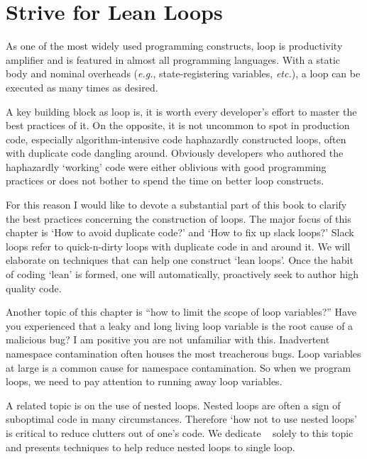 
\chapter{Strive for Lean Loops} \label{ch:loops}

As one of the most widely used programming constructs, loop is productivity
amplifier and is featured in almost all programming languages.
With a static body and nominal overheads (\textit{e.g.},
state-registering variables, \textit{etc.}), a loop can be executed as many times as desired.


A key building block as loop is, it is worth every developer's effort to master the best
practices of it.
On the opposite, it is not uncommon to spot in production code, especially algorithm-intensive code
haphazardly constructed loops, often with duplicate code dangling around.
Obviously developers who authored the haphazardly `working' code were either oblivious
with good programming practices or does not bother to spend the time on better loop constructs.


For this reason I would like to devote a substantial part of this book to clarify the best practices
concerning the construction of loops.
The major focus of this chapter is `How to avoid duplicate code?' and
`How to fix up slack loops?'
Slack loops refer to quick-n-dirty loops with duplicate code in and around it.
We will elaborate on techniques that can help one construct `lean loops'.
Once the habit of coding `lean' is formed, one will automatically, proactively seek to author high
quality code.


Another topic of this chapter is ``how to limit the scope of loop variables?''
Have you experienced that a leaky and long living loop variable is the root cause of a malicious
bug?
I am positive you are not unfamiliar with this.
Inadvertent namespace contamination often houses the most treacherous bugs.
Loop variables at large is a common cause for namespace contamination.
So when we program loops, we need to pay attention to running away loop variables.


A related topic is on the use of nested loops.
Nested loops are often a sign of suboptimal code in many circumstances.
Therefore `how not to use nested loops' is critical to reduce clutters out of one's code.
We dedicate ~ solely to this topic and presents techniques to help
reduce nested loops to single loop.


